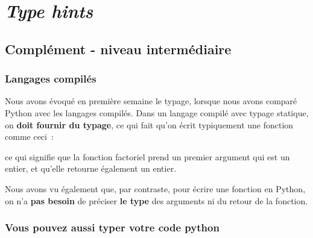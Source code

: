     
    
    
    

    

    \hypertarget{type-hints}{%
\section{\texorpdfstring{\emph{Type
hints}}{Type hints}}\label{type-hints}}

    \hypertarget{compluxe9ment---niveau-intermuxe9diaire}{%
\subsection{Complément - niveau
intermédiaire}\label{compluxe9ment---niveau-intermuxe9diaire}}

    \hypertarget{langages-compiluxe9s}{%
\subsubsection{Langages compilés}\label{langages-compiluxe9s}}

    Nous avons évoqué en première semaine le typage, lorsque nous avons
comparé Python avec les langages compilés. Dans un langage compilé avec
typage statique, on \textbf{doit fournir du typage}, ce qui fait qu'on
écrit typiquement une fonction comme ceci~:

\begin{Shaded}
\begin{Highlighting}[frame=lines,framerule=0.6mm,rulecolor=\color{asisframecolor}]
  \NormalTok{);}
\NormalTok{\}}
\end{Highlighting}
\end{Shaded}

ce qui signifie que la fonction factoriel prend un premier argument qui
est un entier, et qu'elle retourne également un entier.

    Nous avons vu également que, par contraste, pour écrire une fonction en
Python, on n'a \textbf{pas besoin} de préciser \textbf{le type} des
arguments ni du retour de la fonction.

    \hypertarget{vous-pouvez-aussi-typer-votre-code-python}{%
\subsubsection{Vous pouvez aussi typer votre code
python}\label{vous-pouvez-aussi-typer-votre-code-python}}

